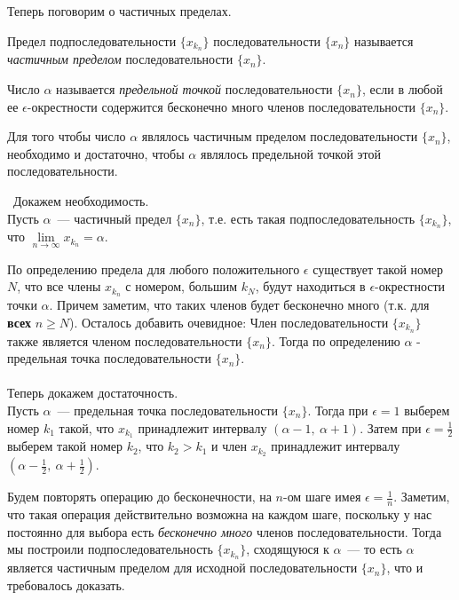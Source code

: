 Теперь поговорим о частичных пределах.

\begin{definition}
Предел подпоследовательности \(\{x_{k_{n}}\}\) последовательности \(\{x_{n}\}\)
называется \textit{частичным пределом} последовательности \(\{x_{n}\}\).
\end{definition}

\begin{definition}
Число \(\alpha\) называется \textit{предельной точкой} последовательности \(\{x_{n}\}\),
если в любой ее \(\epsilon\)-окрестности содержится бесконечно
много членов последовательности \(\{x_{n}\}\).
\end{definition}

\begin{theorem}
Для того чтобы число \(\alpha\) являлось частичным пределом последовательности \(\{x_{n}\}\),
необходимо и достаточно, чтобы \(\alpha\) являлось предельной точкой этой последовательности.

\vspace{2mm}

\proofname~Докажем необходимость. \\
\indent Пусть \(\alpha\)~--- частичный предел \(\{x_{n}\}\), т.е. есть такая подпоследовательность
\(\{x_{k_{n}}\}\), что \(\lim\limits_{n \to \infty}{x_{k_{n}}} = \alpha.\)

По определению предела для любого положительного \(\epsilon\) существует такой номер \(N\), 
что все члены \(x_{k_{n}}\) с номером, большим \(k_{N}\), будут находиться 
в \(\epsilon\)-окрестности точки \(\alpha\). Причем заметим, что таких членов
будет бесконечно много (т.к. для \textbf{всех} \(n \geq N\)). Осталось добавить очевидное:
Член последовательности \(\{x_{k_{n}}\}\) также является 
членом последовательности \(\{x_{n}\}\). Тогда по определению
\(\alpha\) - предельная точка последовательности \(\{x_{n}\}\).\\
\\
\indent Теперь докажем достаточность. \\
\indent Пусть \(\alpha\)~--- предельная точка последовательности \(\{x_{n}\}\).
Тогда при \(\epsilon=1\) выберем номер \(k_{1}\) такой, что \(x_{k_{1}}\) принадлежит
интервалу \((\alpha - 1, ~ \alpha + 1)\). Затем при \(\epsilon = \frac{1}{2}\) выберем
такой номер \(k_{2}\), что \(k_{2} > k_{1}\) и член \(x_{k_{2}}\) принадлежит
интервалу \(\left( \alpha - \frac{1}{2}, ~ \alpha + \frac{1}{2} \right)\).

Будем повторять операцию до бесконечности, на \(n\)-ом шаге имея \(\epsilon = \frac{1}{n}\).
Заметим, что такая операция действительно возможна на каждом шаге, поскольку
у нас постоянно для выбора есть \textit{бесконечно много} членов последовательности.
Тогда мы построили подпоследовательность \(\{x_{k_{n}}\}\), сходящуюся к \(\alpha\)~---
то есть \(\alpha\) является частичным пределом для исходной последовательности \(\{x_{n}\}\),
что и требовалось доказать.~\qedsymbol
\end{theorem}

